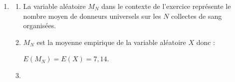 \begin{enumerate}
\begin{enumerate}
La variable aléatoire $X$ compte le nombre de succès.

Donc $X$ suit une loi binomiale de paramètres $n=100$ et $p=\np{0,0714}$.
		\item $P(X \leq 7 ) \approx \np{0,57714}$.

À $10^{-3}$ près, la probabilité  qu'il y ait au plus 7 donneurs universels dans cet échantillon vaut $0,577$.
		\item  $X$ suit une loi binomiale de paramètres $n=100$ et $p=\np{0,0714}$ donc :

$\begin{aligned}[t] E(X)& =n \times p \\&= 100 \times 0,0714\\&=7,14\end{aligned}$
	\hfill~
$\begin{aligned}[t] V(X)& = n \times p \times (1-p)\\& = 100 \times 0,0714 \times (1- 0,714) \\& = \np{6,630204}\\
	& 	\approx 6,63\quad\text{ à }10^{-2} \text{ près.}
\end{aligned}$
\hfill~
	\end{enumerate}
\item
	\begin{enumerate}
		\item  La variable aléatoire $M_{N}$ dans le contexte de l'exercice représente le nombre moyen de donneurs universels sur les $N$ collectes de sang organisées.

		\item  $M_N$ est la moyenne empirique de la variable aléatoire $X$ donc :
		
$E\left(M_{N}\right)=E(X) =7,14$.
		\item


\end{enumerate}
\end{enumerate}
